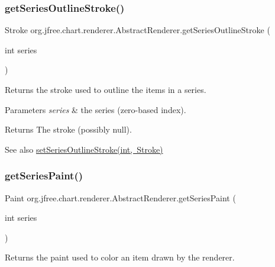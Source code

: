 \subsubsection{\texorpdfstring{get\+Series\+Outline\+Stroke()}{getSeriesOutlineStroke()}}
{\footnotesize\ttfamily Stroke org.\+jfree.\+chart.\+renderer.\+Abstract\+Renderer.\+get\+Series\+Outline\+Stroke (\begin{DoxyParamCaption}\item[{int}]{series }\end{DoxyParamCaption})}

Returns the stroke used to outline the items in a series.


\begin{DoxyParams}{Parameters}
{\em series} & the series (zero-\/based index).\\
\hline
\end{DoxyParams}
\begin{DoxyReturn}{Returns}
The stroke (possibly {\ttfamily null}).
\end{DoxyReturn}
\begin{DoxySeeAlso}{See also}
\mbox{\hyperlink{classorg_1_1jfree_1_1chart_1_1renderer_1_1_abstract_renderer_a1c87d3b5de25398fa7e6985a5bad65e4}{set\+Series\+Outline\+Stroke(int, Stroke)}} 
\end{DoxySeeAlso}
\mbox{\label{classorg_1_1jfree_1_1chart_1_1renderer_1_1_abstract_renderer_a34de4b630890c8c5ec3b4157cb709ec9}} 
\subsubsection{\texorpdfstring{get\+Series\+Paint()}{getSeriesPaint()}}
{\footnotesize\ttfamily Paint org.\+jfree.\+chart.\+renderer.\+Abstract\+Renderer.\+get\+Series\+Paint (\begin{DoxyParamCaption}\item[{int}]{series }\end{DoxyParamCaption})}

Returns the paint used to color an item drawn by the renderer.


